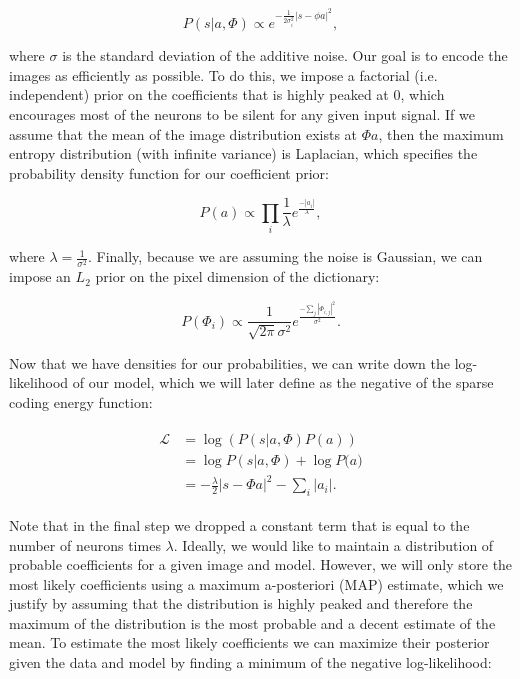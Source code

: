 \begin{equation}\label{eq:ch2_image_likelihood}
    P(s|a,\Phi) \propto e^{-\frac{1}{2\sigma_{i}^{2}}|s-\phi a|^{2}},
\end{equation}

\noindent where $\sigma$ is the standard deviation of the additive noise. Our goal is to encode the images as efficiently as possible. To do this, we impose a factorial (i.e. independent) prior on the coefficients that is highly peaked at 0, which encourages most of the neurons to be silent for any given input signal. If we assume that the mean of the image distribution exists at $\Phi a$, then the maximum entropy distribution (with infinite variance) is Laplacian, which specifies the probability density function for our coefficient prior:

\begin{equation}\label{eq:ch2_coefficient_prior}
    P(a) \propto \prod_{i}\frac{1}{\lambda} e^{\frac{-|a_{i}|}{\lambda}},
\end{equation}

\noindent where $\lambda = \tfrac{1}{\sigma^{2}}$. Finally, because we are assuming the noise is Gaussian, we can impose an $L_{2}$ prior on the pixel dimension of the dictionary:

\begin{equation}\label{eq:ch2_dictionary_prior}
    P(\Phi_{i}) \propto \frac{1}{\sqrt{2\pi}\sigma^{2}}e^{\frac{-\sum_{j}|\Phi_{i,j}|^{2}}{\sigma^{2}}}.
\end{equation}

Now that we have densities for our probabilities, we can write down the log-likelihood of our model, which we will later define as the negative of the sparse coding energy function:

\begin{align}\label{eq:ch2_log_likelihood}
\begin{split}
    \mathcal{L} &= \log\left(P(s|a,\Phi)P(a)\right) \\
                &= \log{P(s|a,\Phi)} + \log{P(a}) \\
                &= -\frac{\lambda}{2}|s - \Phi a|^{2} - \sum_{i}|a_{i}|.
\end{split}
\end{align}

Note that in the final step we dropped a constant term that is equal to the number of neurons times $\lambda$. Ideally, we would like to maintain a distribution of probable coefficients for a given image and model. However, we will only store the most likely coefficients using a maximum a-posteriori (MAP) estimate, which we justify by assuming that the distribution is highly peaked and therefore the maximum of the distribution is the most probable and a decent estimate of the mean. To estimate the most likely coefficients we can maximize their posterior given the data and model by finding a minimum of the negative log-likelihood:

